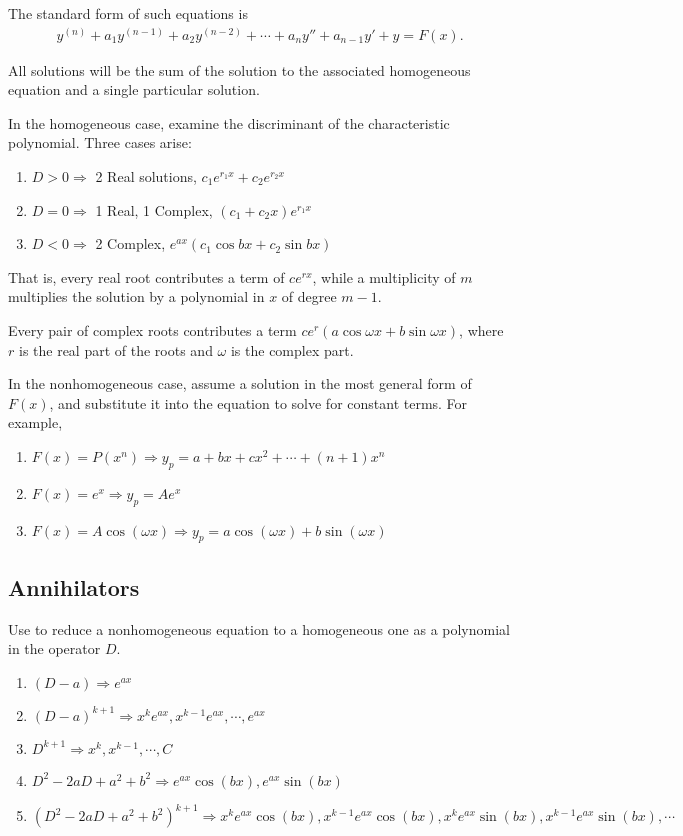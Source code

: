 The standard form of such equations is \begin{align*}
    y^{(n)} + a_1y^{(n-1)} + a_2y^{(n-2)} + \cdots +a_ny'' + a_{n-1}y' + y = F(x).
\end{align*}

All solutions will be the sum of the solution to the associated
homogeneous equation and a single particular solution.

In the homogeneous case, examine the discriminant of the characteristic
polynomial. Three cases arise:

\begin{enumerate}
    \item $D>0 \Rightarrow$ 2 Real solutions, $c_1e^{r_1x} + c_2e^{r_2x}$
    \item $D=0 \Rightarrow$ 1 Real, 1 Complex, $(c_1 +c_2x)e^{r_1x}$
    \item $D<0 \Rightarrow$ 2 Complex, $e^{ax}(c_1\cos bx + c_2\sin bx)$
\end{enumerate}

That is, every real root contributes a term of \(ce^{rx}\), while a
multiplicity of \(m\) multiplies the solution by a polynomial in \(x\)
of degree \(m-1\).

Every pair of complex roots contributes a term
\(ce^r(a\cos \omega x + b\sin \omega x)\), where \(r\) is the real part
of the roots and \(\omega\) is the complex part.

In the nonhomogeneous case, assume a solution in the most general form
of \(F(x)\), and substitute it into the equation to solve for constant
terms. For example,

\begin{enumerate}
    \item $F(x) = P(x^n) \Rightarrow y_p = a+bx+cx^2+\cdots+(n+1)x^n$
    \item $F(x) = e^x \Rightarrow y_p = Ae^x$
    \item $F(x) = A\cos (\omega x) \Rightarrow y_p = a\cos(\omega x) + b\sin(\omega x)$
\end{enumerate}

\subsection{Annihilators}

Use to reduce a nonhomogeneous equation to a homogeneous one as a
polynomial in the operator \(D\).

\begin{enumerate}
    \item $(D-a) \Rightarrow e^{ax}$
    \item $(D-a)^{k+1} \Rightarrow x^k e^{ax}, x^{k-1}e^{ax}, \cdots, e^{ax}$
    \item $D^{k+1} \Rightarrow x^k, x^{k-1}, \cdots,C$
    \item $D^2-2aD+a^2+b^2 \Rightarrow e^{ax}\cos(bx), e^{ax}\sin(bx)$
    \item $(D^2-2aD+a^2+b^2)^{k+1} \Rightarrow x^k e^{ax}\cos(bx), x^{k-1} e^{ax}\cos(bx), x^k e^{ax}\sin(bx), x^{k-1}e^{ax}\sin(bx),\cdots$
\end{enumerate}

